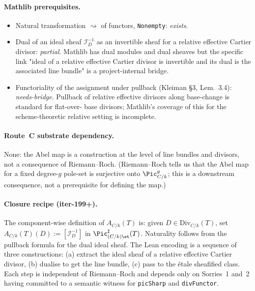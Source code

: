 \paragraph{Mathlib prerequisites.}
\begin{itemize}
  \item Natural transformation \texttt{${\rightsquigarrow}$} of
    functors, \texttt{Nonempty}: \emph{exists}.
  \item Dual of an ideal sheaf $\mathcal{I}_D^{-1}$ as an invertible
    sheaf for a relative effective Cartier divisor: \emph{partial}.
    Mathlib has dual modules and dual sheaves but the specific link
    "ideal of a relative effective Cartier divisor is invertible and
    its dual is the associated line bundle" is a project-internal
    bridge.
  \item Functoriality of the assignment under pullback (Kleiman \S3,
    Lem.~3.4): \emph{needs-bridge}. Pullback of relative
    effective divisors along base-change is standard for flat-over-
    base divisors; Mathlib's coverage of this for the scheme-theoretic
    relative setting is incomplete.
\end{itemize}

\paragraph{Route~C substrate dependency.} None: the Abel map is a
construction at the level of line bundles and divisors, not a
consequence of Riemann--Roch. (Riemann--Roch tells us that the Abel
map for a fixed degree-$g$ pole-set is surjective onto $\Pic^g_{C/k}$;
this is a downstream consequence, not a prerequisite for defining the
map.)

\paragraph{Closure recipe (iter-199+).} The component-wise definition
of $A_{C/k}(T)$ is: given $D \in \mathrm{Div}_{C/k}(T)$, set
$A_{C/k}(T)(D) := [\mathcal{I}_D^{-1}]$ in
$\Pic^\sharp_{(C/k)\et}(T)$. Naturality follows from the pullback
formula for the dual ideal sheaf. The Lean encoding is a sequence of
three constructions: (a) extract the ideal sheaf of a relative
effective Cartier divisor, (b) dualise to get the line bundle,
(c) pass to the \'etale sheafified class. Each step is independent of
Riemann--Roch and depends only on Sorries~1 and~2 having committed to
a semantic witness for \texttt{picSharp} and \texttt{divFunctor}.

